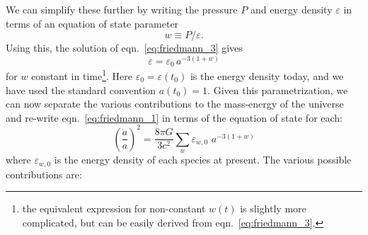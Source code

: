 We can simplify these further by writing the pressure $P$ and energy
density $\varepsilon$ in terms of an equation of state parameter
\begin{equation}
  \label{eq:w_EOS}
  w \equiv P / \varepsilon.
\end{equation}
Using this, the solution of eqn.~\ref{eq:friedmann_3} gives
\begin{equation}
  \varepsilon = \varepsilon_0\, a^{-3(1 + w)}
\end{equation}
for $w$ constant in time\footnote{the equivalent expression for
  non-constant $w(t)$ is slightly more complicated, but can be easily
  derived from eqn.~\ref{eq:friedmann_3}.}.
Here $\varepsilon_0 = \varepsilon(t_0)$ is the energy density today,
and we have used the standard convention $a(t_0) = 1$.
Given this parametrization, we can now
separate the various contributions to the mass-energy of the universe
and re-write eqn.~\ref{eq:friedmann_1} in terms of the equation of
state for each:
\begin{equation}
  \label{eq:friedmann_1_split}
  \left(\frac{\dot{a}}{a}\right)^2 = \frac{8\pi G}{3c^2}
  \sum_w \varepsilon_{w, 0} \,\, a^{-3(1 + w)}
\end{equation}
where $\varepsilon_{w,0}$ is the energy density of each species at present.
The various possible contributions are:
